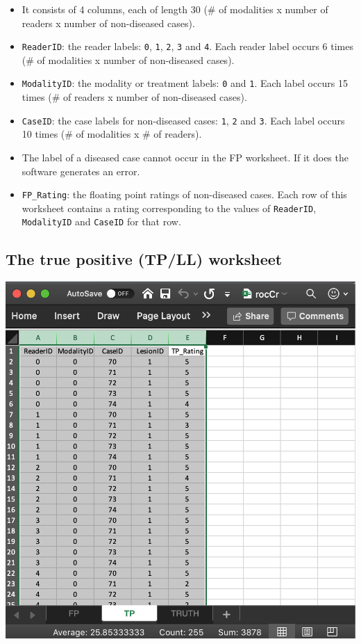 \documentclass[
]{book}
\providecommand{\tightlist}{%
  \setlength{\itemsep}{0pt}\setlength{\parskip}{0pt}}
\begin{document}
\begin{itemize}
\tightlist
\item
  It consists of 4 columns, each of length 30 (\# of modalities x number of readers x number of non-diseased cases).
\item
  \texttt{ReaderID}: the reader labels: \texttt{0}, \texttt{1}, \texttt{2}, \texttt{3} and \texttt{4}. Each reader label occurs 6 times (\# of modalities x number of non-diseased cases).
\item
  \texttt{ModalityID}: the modality or treatment labels: \texttt{0} and \texttt{1}. Each label occurs 15 times (\# of readers x number of non-diseased cases).
\item
  \texttt{CaseID}: the case labels for non-diseased cases: \texttt{1}, \texttt{2} and \texttt{3}. Each label occurs 10 times (\# of modalities x \# of readers).
\item
  The label of a diseased case cannot occur in the FP worksheet. If it does the software generates an error.
\item
  \texttt{FP\_Rating}: the floating point ratings of non-diseased cases. Each row of this worksheet contains a rating corresponding to the values of \texttt{ReaderID}, \texttt{ModalityID} and \texttt{CaseID} for that row.
\end{itemize}

\hypertarget{quick-start-roc-tp}{%
\subsection{The true positive (TP/LL) worksheet}\label{quick-start-roc-tp}}

\includegraphics[width=1\textwidth,height=\textheight]{images/quick-start/rocCrTp.png}
\end{document}
